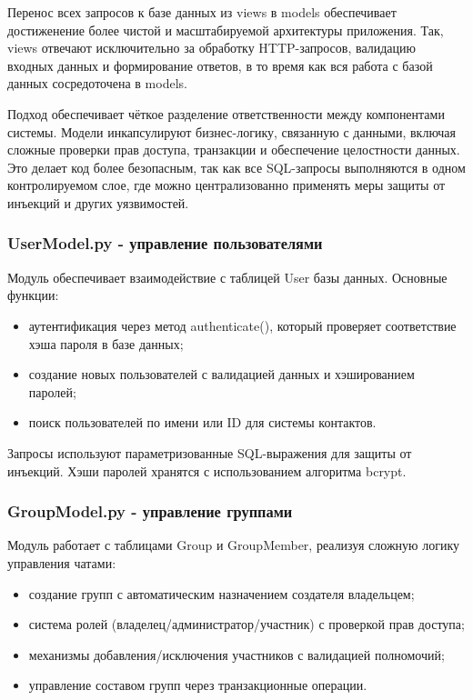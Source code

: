 Перенос всех запросов к базе данных из views в models обеспечивает достиженение более чистой и масштабируемой архитектуры приложения. Так, views отвечают исключительно за обработку HTTP-запросов, валидацию входных данных и формирование ответов, в то время как вся работа с базой данных сосредоточена в models.

Подход обеспечивает чёткое разделение ответственности между компонентами системы. Модели инкапсулируют бизнес-логику, связанную с данными, включая сложные проверки прав доступа, транзакции и обеспечение целостности данных. Это делает код более безопасным, так как все SQL-запросы выполняются в одном контролируемом слое, где можно централизованно применять меры защиты от инъекций и других уязвимостей.

\subsubsection{UserModel.py - управление пользователями}
Модуль обеспечивает взаимодействие с таблицей User базы данных. Основные функции:
\begin{itemize}
	\item аутентификация через метод authenticate(), который проверяет соответствие хэша пароля в базе данных;
	\item создание новых пользователей с валидацией данных и хэшированием паролей;
	\item поиск пользователей по имени или ID для системы контактов.
\end{itemize}

Запросы используют параметризованные SQL-выражения для защиты от инъекций. Хэши паролей хранятся с использованием алгоритма bcrypt.

\subsubsection{GroupModel.py - управление группами}
Модуль работает с таблицами Group и GroupMember, реализуя сложную логику управления чатами:
\begin{itemize}
	\item создание групп с автоматическим назначением создателя владельцем;
	\item система ролей (владелец/администратор/участник) с проверкой прав доступа;
	\item механизмы добавления/исключения участников с валидацией полномочий;
	\item управление составом групп через транзакционные операции.
\end{itemize}

